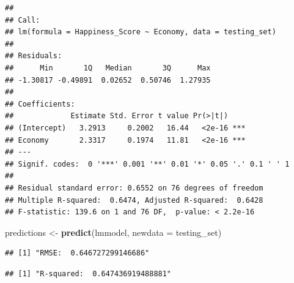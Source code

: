 \documentclass[
  11pt,
]{article}
\newenvironment{Shaded}{\begin{snugshade}}{\end{snugshade}}
\newcommand{\AttributeTok}[1]{\textcolor[rgb]{0.13,0.29,0.53}{#1}}
\newcommand{\DecValTok}[1]{\textcolor[rgb]{0.00,0.00,0.81}{#1}}
\newcommand{\FunctionTok}[1]{\textcolor[rgb]{0.13,0.29,0.53}{\textbf{#1}}}
\newcommand{\NormalTok}[1]{#1}
\newcommand{\OtherTok}[1]{\textcolor[rgb]{0.56,0.35,0.01}{#1}}
\newcommand{\SpecialCharTok}[1]{\textcolor[rgb]{0.81,0.36,0.00}{\textbf{#1}}}
\newcommand{\StringTok}[1]{\textcolor[rgb]{0.31,0.60,0.02}{#1}}
\begin{document}
\begin{verbatim}
## 
## Call:
## lm(formula = Happiness_Score ~ Economy, data = testing_set)
## 
## Residuals:
##      Min       1Q   Median       3Q      Max 
## -1.30817 -0.49891  0.02652  0.50746  1.27935 
## 
## Coefficients:
##             Estimate Std. Error t value Pr(>|t|)    
## (Intercept)   3.2913     0.2002   16.44   <2e-16 ***
## Economy       2.3317     0.1974   11.81   <2e-16 ***
## ---
## Signif. codes:  0 '***' 0.001 '**' 0.01 '*' 0.05 '.' 0.1 ' ' 1
## 
## Residual standard error: 0.6552 on 76 degrees of freedom
## Multiple R-squared:  0.6474, Adjusted R-squared:  0.6428 
## F-statistic: 139.6 on 1 and 76 DF,  p-value: < 2.2e-16
\end{verbatim}

\begin{Shaded}
\begin{Highlighting}[]
\NormalTok{predictions }\OtherTok{\textless{}{-}} \FunctionTok{predict}\NormalTok{(lmmodel, }\AttributeTok{newdata =}\NormalTok{ testing\_set)}
\end{Highlighting}
\end{Shaded}

\begin{Shaded}
\end{Shaded}

\begin{verbatim}
## [1] "RMSE:  0.646727299146686"
\end{verbatim}

\begin{Shaded}
\end{Shaded}

\begin{verbatim}
## [1] "R-squared:  0.647436919488881"
\end{verbatim}
\end{document}
